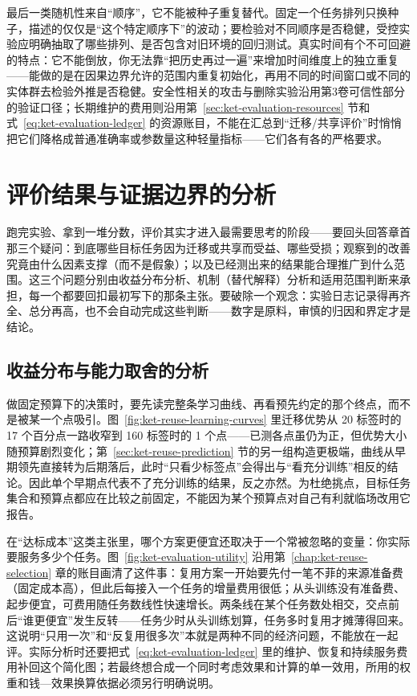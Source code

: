 最后一类随机性来自“顺序”，它不能被种子重复替代。固定一个任务排列只换种子，描述的仅仅是“这个特定顺序下”的波动；要检验对不同顺序是否稳健，受控实验应明确抽取了哪些排列、是否包含对旧环境的回归测试。真实时间有个不可回避的特点：它不能倒放，你无法靠“把历史再过一遍”来增加时间维度上的独立重复——能做的是在因果边界允许的范围内重复初始化，再用不同的时间窗口或不同的实体群去检验外推是否稳健。安全性相关的攻击与删除实验沿用第3卷可信性部分的验证口径；长期维护的费用则沿用第~\ref{sec:ket-evaluation-resources} 节和式~\eqref{eq:ket-evaluation-ledger} 的资源账目，不能在汇总到“迁移/共享评价”时悄悄把它们降格成普通准确率或参数量这种轻量指标——它们各有各的严格要求。

\section{评价结果与证据边界的分析}
\label{sec:ket-evaluation-analysis}

跑完实验、拿到一堆分数，评价其实才进入最需要思考的阶段——要回头回答章首那三个疑问：到底哪些目标任务因为迁移或共享而受益、哪些受损；观察到的改善究竟由什么因素支撑（而不是假象）；以及已经测出来的结果能合理推广到什么范围。这三个问题分别由收益分布分析、机制（替代解释）分析和适用范围判断来承担，每一个都要回扣最初写下的那条主张。要破除一个观念：实验日志记录得再齐全、总分再高，也不会自动完成这些判断——数字是原料，审慎的归因和界定才是结论。

\subsection{收益分布与能力取舍的分析}
\label{sec:ket-evaluation-distribution}

做固定预算下的决策时，要先读完整条学习曲线、再看预先约定的那个终点，而不是被某一个点吸引。图~\ref{fig:ket-reuse-learning-curves} 里迁移优势从 20 标签时的 17 个百分点一路收窄到 160 标签时的 1 个点——已测各点虽仍为正，但优势大小随预算剧烈变化；第~\ref{sec:ket-reuse-prediction} 节的另一组构造更极端，曲线从早期领先直接转为后期落后，此时“只看少标签点”会得出与“看充分训练”相反的结论。因此单个早期点代表不了充分训练的结果，反之亦然。为杜绝挑点，目标任务集合和预算点都应在比较之前固定，不能因为某个预算点对自己有利就临场改用它报告。

在“达标成本”这类主张里，哪个方案更便宜还取决于一个常被忽略的变量：你实际要服务多少个任务。图~\ref{fig:ket-evaluation-utility} 沿用第~\ref{chap:ket-reuse-selection} 章的账目画清了这件事：复用方案一开始要先付一笔不菲的来源准备费（固定成本高），但此后每接入一个任务的增量费用很低；从头训练没有准备费、起步便宜，可费用随任务数线性快速增长。两条线在某个任务数处相交，交点前后“谁更便宜”发生反转——任务少时从头训练划算，任务多时复用才摊薄得回来。这说明“只用一次”和“反复用很多次”本就是两种不同的经济问题，不能放在一起评。实际分析时还要把式~\eqref{eq:ket-evaluation-ledger} 里的维护、恢复和持续服务费用补回这个简化图；若最终想合成一个同时考虑效果和计算的单一效用，所用的权重和钱—效果换算依据必须另行明确说明。

